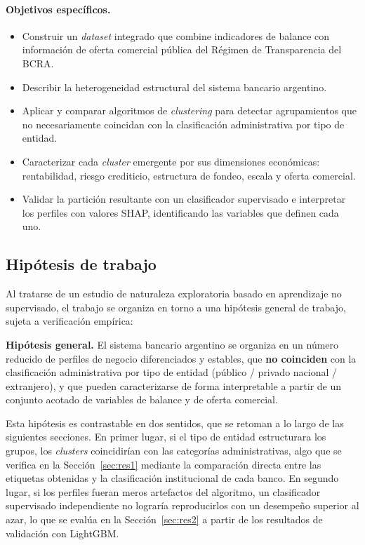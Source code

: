 \documentclass[11pt,a4paper]{article}
\begin{document}
\paragraph{Objetivos específicos.}
\begin{itemize}
  \item Construir un \textit{dataset} integrado que combine indicadores de balance con información de
  oferta comercial pública del Régimen de Transparencia del BCRA.
  \item Describir la heterogeneidad estructural del sistema bancario argentino.
  \item Aplicar y comparar algoritmos de \textit{clustering} para detectar agrupamientos que no
  necesariamente coincidan con la clasificación administrativa por tipo de entidad.
  \item Caracterizar cada \textit{cluster} emergente por sus dimensiones económicas: rentabilidad,
  riesgo crediticio, estructura de fondeo, escala y oferta comercial.
  \item Validar la partición resultante con un clasificador supervisado e interpretar los perfiles con
  valores SHAP, identificando las variables que definen cada uno.
\end{itemize}

\subsection{Hipótesis de trabajo}

Al tratarse de un estudio de naturaleza exploratoria basado en aprendizaje no supervisado, el trabajo
se organiza en torno a una hipótesis general de trabajo, sujeta a verificación empírica:

\begin{notebox}
\textbf{Hipótesis general.} El sistema bancario argentino se organiza en un número reducido de perfiles
de negocio diferenciados y estables, que \textbf{no coinciden} con la clasificación administrativa por
tipo de entidad (público / privado nacional / extranjero), y que pueden caracterizarse de forma
interpretable a partir de un conjunto acotado de variables de balance y de oferta comercial.
\end{notebox}

\noindent Esta hipótesis es contrastable en dos sentidos, que se retoman a lo largo de las siguientes secciones. En primer lugar, si el tipo de entidad estructurara los grupos, los \textit{clusters} coincidirían con las categorías administrativas, algo que se verifica en la Sección~\ref{sec:res1} mediante la comparación directa entre las etiquetas obtenidas y la clasificación institucional de cada banco. En segundo lugar, si los perfiles fueran meros artefactos del algoritmo, un clasificador supervisado independiente no lograría reproducirlos con un desempeño superior al azar, lo que se evalúa en la Sección~\ref{sec:res2} a partir de los resultados de validación con LightGBM.
\end{document}
